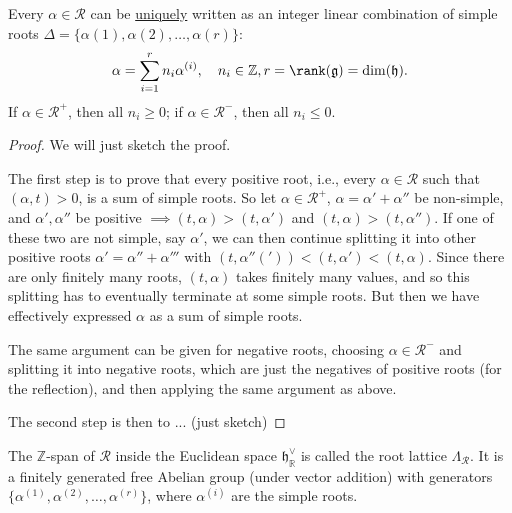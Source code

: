 \begin{theorem}
    Every \(\alpha \in \mathcal{R}\) can be \uline{uniquely} written as an integer linear combination of simple roots \(\Delta = \{\alpha(1), \alpha(2), \ldots, \alpha(r)\}\):
    \[
        \alpha = \sum_{i=1}^r n_i \alpha^{(i)}, \quad n_i \in \mathbb{Z}, r = \rank(\mathfrak{g}) = \dim(\mathfrak{h}).
    \]
    If \(\alpha \in \mathcal{R}^+\), then all \(n_i \geq 0\); if \(\alpha \in \mathcal{R}^-\), then all \(n_i \leq 0\).
\end{theorem}
\begin{proof}
    We will just sketch the proof.

    The first step is to prove that every positive root, i.e., every \(\alpha \in \mathcal{R} \) such that \((\alpha, t) > 0\), is a sum of simple roots. So let \(\alpha \in \mathcal{R}^+\), \(\alpha = \alpha' + \alpha''\) be non-simple, and \(\alpha', \alpha''\) be positive  \(\implies (t, \alpha) > (t, \alpha')\) and \((t, \alpha) > (t, \alpha'')\). If one of these two are not simple, say \(\alpha'\), we can then continue splitting it into other positive roots \(\alpha' = \alpha'' + \alpha'''\) with \((t, \alpha'' (') ) < (t, \alpha') < (t, \alpha)\). Since there are only finitely many roots, \((t, \alpha)\) takes finitely many values, and so this splitting has to eventually terminate at some simple roots. But then we have effectively expressed \(\alpha\) as a sum of simple roots.

    The same argument can be given for negative roots, choosing \(\alpha \in \mathcal{R}^-\) and splitting it into negative roots, which are just the negatives of positive roots (for the reflection), and then applying the same argument as above.

    The second step is then to ... (just sketch)

\end{proof}

\begin{definition}
    The \(\mathbb{Z}\)-span of \(\mathcal{R}\) inside the Euclidean space \(\mathfrak{h}_\mathbb{R}^\vee\) is called the root lattice \(\Lambda_{\mathcal{R}} \). It is a finitely generated free Abelian group (under vector addition) with generators \(\{\alpha^{(1)}, \alpha^{(2)}, \ldots, \alpha^{(r)}\}\), where \(\alpha^{(i)}\) are the simple roots.
\end{definition}